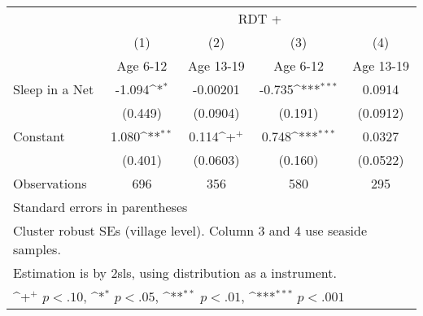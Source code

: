 {
\def\sym#1{\ifmmode^{#1}\else\(^{#1}\)\fi}
\begin{tabular}{l*{4}{c}}
\hline\hline
                    &\multicolumn{4}{c}{RDT +}                                                              \\
                    &\multicolumn{1}{c}{(1)}         &\multicolumn{1}{c}{(2)}         &\multicolumn{1}{c}{(3)}         &\multicolumn{1}{c}{(4)}         \\
                    &    Age 6-12         &   Age 13-19         &    Age 6-12         &   Age 13-19         \\
\hline
Sleep in a Net      &      -1.094\sym{*}  &    -0.00201         &      -0.735\sym{***}&      0.0914         \\
                    &     (0.449)         &    (0.0904)         &     (0.191)         &    (0.0912)         \\
[1em]
Constant            &       1.080\sym{**} &       0.114\sym{+}  &       0.748\sym{***}&      0.0327         \\
                    &     (0.401)         &    (0.0603)         &     (0.160)         &    (0.0522)         \\
\hline
Observations        &         696         &         356         &         580         &         295         \\
\hline\hline
\multicolumn{5}{l}{\footnotesize Standard errors in parentheses}\\
\multicolumn{5}{l}{\footnotesize Cluster robust SEs (village level). Column 3 and 4 use seaside samples.}\\
\multicolumn{5}{l}{\footnotesize Estimation is by 2sls, using distribution as a instrument.}\\
\multicolumn{5}{l}{\footnotesize \sym{+} \(p<.10\), \sym{*} \(p<.05\), \sym{**} \(p<.01\), \sym{***} \(p<.001\)}\\
\end{tabular}
}
